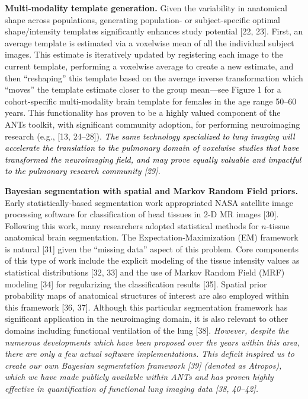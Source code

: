 \documentclass[11pt,]{article}
\begin{document}
\textbf{Multi-modality template generation.} Given the variability in
anatomical shape across populations, generating population- or
subject-specific optimal shape/intensity templates significantly
enhances study potential {[}22, 23{]}. First, an average template is
estimated via a voxelwise mean of all the individual subject images.
This estimate is iteratively updated by registering each image to the
current template, performing a voxelwise average to create a new
estimate, and then ``reshaping'' this template based on the average
inverse transformation which ``moves'' the template estimate closer to
the group mean---see Figure 1 for a cohort-specific multi-modality brain
template for females in the age range 50--60 \textcolor{black}{years}.
This functionality has proven to be a \textcolor{black}{highly valued}
component of the ANTs toolkit, with significant community adoption, for
performing neuroimaging research (e.g., {[}13, 24--28{]}).
\emph{\textcolor{black}{The same technology specialized to lung imaging will accelerate the
translation to the pulmonary domain of voxelwise studies that have transformed the
neuroimaging field, and may prove equally valuable and impactful to the pulmonary
research community} {[}29{]}.}

\textbf{Bayesian segmentation with spatial and Markov Random Field
priors.} Early statistically-based segmentation work appropriated NASA
satellite image processing software for classification of head tissues
in 2-D MR images {[}30{]}. Following this work, many researchers adopted
statistical methods for \(n\)-tissue anatomical brain segmentation. The
Expectation-Maximization (EM) framework is natural {[}31{]} given the
``missing data'' aspect of this problem. Core components of this type of
work include the explicit modeling of the tissue intensity values as
statistical distributions {[}32, 33{]} and the use of Markov Random
Field (MRF) modeling {[}34{]} for regularizing the classification
results {[}35{]}. Spatial prior probability maps of anatomical
structures of interest are also employed within this framework {[}36,
37{]}. Although this particular segmentation framework has significant
application in the neuroimaging domain, it is also relevant to other
domains including functional ventilation of the lung {[}38{]}.
\emph{However, despite the numerous developments which have been
proposed over the years within this area, there are only a few actual
software implementations. This deficit inspired us to create our own
Bayesian segmentation framework {[}39{]} (denoted as Atropos), which we
have made publicly available within ANTs and has proven highly effective
in quantification of functional lung imaging data {[}38, 40--42{]}.}
\end{document}
